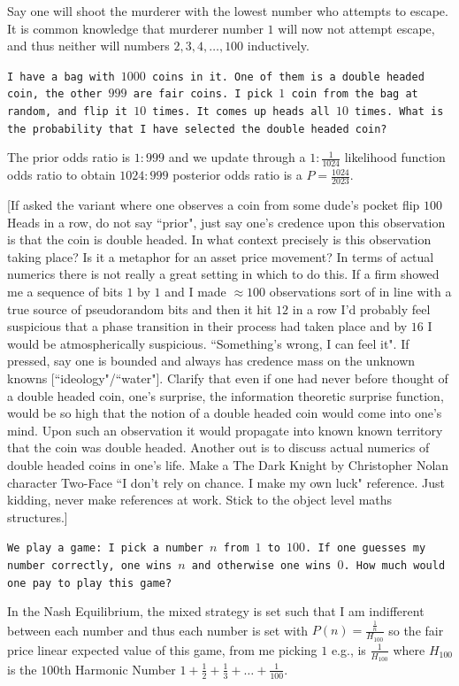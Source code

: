 Say one will shoot the murderer with the lowest number who attempts to escape. It is common knowledge that murderer number $1$ will now not attempt escape, and thus neither will numbers $2,3,4,\dots,100$ inductively.

\texttt{I have a bag with $1000$ coins in it. One of them is a double headed coin, the other $999$ are fair coins. I pick $1$ coin from the bag at random, and flip it $10$ times. It comes up heads all $10$ times. What is the probability that I have selected the double headed coin?}

The prior odds ratio is $1:999$ and we update through a $1:\frac{1}{1024}$ likelihood function odds ratio to obtain $1024:999$ posterior odds ratio is a $P=\boxed{\frac{1024}{2023}}$.

[If asked the variant where one observes a coin from some dude's pocket flip $100$ Heads in a row, do not say ``prior", just say one's credence upon this observation is that the coin is double headed. In what context precisely is this observation taking place? Is it a metaphor for an asset price movement? In terms of actual numerics there is not really a great setting in which to do this. If a firm showed me a sequence of bits $1$ by $1$ and I made $\approx 100$ observations sort of in line with a true source of pseudorandom bits and then it hit $12$ in a row I'd probably feel suspicious that a phase transition in their process had taken place and by $16$ I would be atmospherically suspicious. ``Something's wrong, I can feel it". If pressed, say one is bounded and always has credence mass on the unknown knowns [``ideology"/``water"]. Clarify that even if one had never before thought of a double headed coin, one's surprise, the information theoretic surprise function, would be so high that the notion of a double headed coin would come into one's mind. Upon such an observation it would propagate into known known territory that the coin was double headed. Another out is to discuss actual numerics of double headed coins in one's life. Make a The Dark Knight by Christopher Nolan character Two-Face ``I don't rely on chance. I make my own luck" reference. Just kidding, never make references at work. Stick to the object level maths structures.]

\texttt{We play a game: I pick a number $n$ from $1$ to $100$. If one guesses my number correctly, one wins $n$ and otherwise one wins $0$. How much would one pay to play this game?}

In the Nash Equilibrium, the mixed strategy is set such that I am indifferent between each number and thus each number is set with $P(n)=\frac{\frac{1}{n}}{H_{100}}$ so the fair price linear expected value of this game, from me picking $1$ e.g., is $\boxed{\frac{1}{H_{100}}}$ where $H_{100}$ is the $100$th Harmonic Number $1+\frac{1}{2}+\frac{1}{3}+\dots+\frac{1}{100}$.

